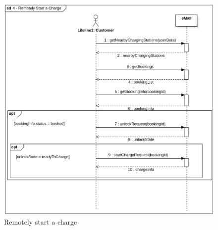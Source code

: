 \begin{figure}[H]
    \begin{center}
        \includegraphics[width=\textwidth]{img/sequence/start.png}
        \caption{Remotely start a charge}
    \end{center}
\end{figure}
\newpage
